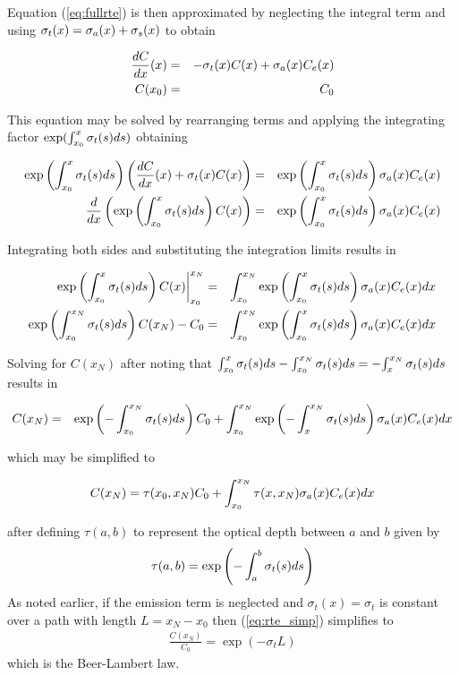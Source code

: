 Equation (\ref{eq:fullrte}) is then approximated by neglecting the integral term and using $\sigma_t(x)=\sigma_a(x)+\sigma_s(x)$ to obtain

\begin{eqnarray*}
\frac{dC}{dx}(x)&=&-\sigma_t(x) C(x) + \sigma_a(x) C_e(x)\\
 C(x_0)&=&C_0
\end{eqnarray*}

This equation may be solved by rearranging terms and applying the integrating factor $\exp(\int_{x_0}^x \sigma_t(s) ds)$ obtaining

\begin{eqnarray*}
\exp\left({\int_{x_0}^{x} \sigma_t(s) ds}\right)\left(\frac{dC}{dx}(x)+\sigma_t(x) C(x)\right)&=&  \exp\left({\int_{x_0}^{x} \sigma_t(s) ds}\right)\sigma_a(x) C_e(x)\\
\frac{d}{dx}\left(\exp\left({\int_{x_0}^{x} \sigma_t(s) ds}\right) C(x)\right)&=& \exp\left({\int_{x_0}^{x} \sigma_t(s) ds}\right)\sigma_a(x) C_e(x)
\end{eqnarray*}

Integrating both sides and substituting the integration limits results in

\begin{eqnarray*}
\left.\exp\left({\int_{x_0}^{x} \sigma_t(s) ds}\right) C(x)\right|_{x_0}^{x_N}&=& \int_{x_0}^{x_N}\exp\left({\int_{x_0}^{x} \sigma_t(s) ds}\right)\sigma_a(x) C_e(x) dx \\
\exp\left({\int_{x_0}^{x_N} \sigma_t(s) ds}\right) C(x_N)-C_0&=& \int_{x_0}^{x_N}\exp\left({\int_{x_0}^{x} \sigma_t(s) ds}\right)\sigma_a(x) C_e(x) dx
\end{eqnarray*}

Solving for $C(x_N)$ after noting that ${\int_{x_0}^{x} \sigma_t(s) ds}-{\int_{x_0}^{x_N} \sigma_t(s) ds}=-{\int_{x}^{x_N} \sigma_t(s) ds}$ results in

\begin{eqnarray*}
C(x_N)&=&\exp\left({-\int_{x_0}^{x_N} \sigma_t(s) ds}\right) C_0+ \int_{x_0}^{x_N}\exp\left({-\int_{x}^{x_N} \sigma_t(s) ds}\right)\sigma_a(x) C_e(x) dx\\
\end{eqnarray*}

which may be simplified to

\begin{equation}
\label{eq:rte_simp}
\label{eq:rtesoln}
 C(x_N)=\tau(x_0,x_N)C_0 + \int_{x_0}^{x_N}\tau(x,x_N)\sigma_a(x)C_e(x) dx
\end{equation}

after defining $\tau(a,b)$ to represent the optical depth between $a$ and $b$ given by
\begin{equation}
\label{eq:optdepth}
\tau(a,b)=\exp\left({-\int_{a}^{b} \sigma_t(s) ds}\right)
\end{equation}
As noted earlier, if the emission term is neglected and $\sigma_t(x)=\sigma_t$ is constant over a path with length
$L=x_N-x_0$ then (\ref{eq:rte_simp}) simplifies to
\begin{eqnarray*}
 \frac{C(x_N)}{C_0}=\exp(-\sigma_tL)
\end{eqnarray*}
which is the Beer-Lambert law.

